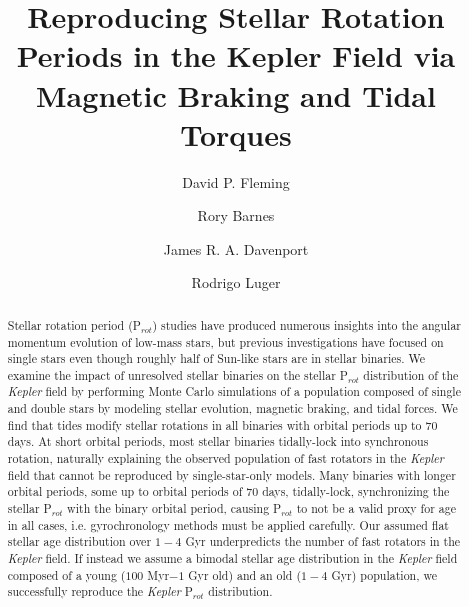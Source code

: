 \documentclass[twocolumn]{aastex61}
\begin{document}
\title{Reproducing Stellar Rotation Periods in the Kepler Field via Magnetic Braking and Tidal Torques}



\author{David P. Fleming}

\author{Rory Barnes}

\author{James R. A. Davenport}

\author{Rodrigo Luger}


\begin{abstract}

Stellar rotation period (P$_{rot}$) studies have produced numerous insights into the angular momentum evolution of low-mass stars, but previous investigations have focused on single stars even though roughly half of Sun-like stars are in stellar binaries. We examine the impact of unresolved stellar binaries on the stellar P$_{rot}$ distribution of the \textit{Kepler} field by performing Monte Carlo simulations of a population composed of single and double stars by modeling stellar evolution, magnetic braking, and tidal forces. We find that tides modify stellar rotations in all binaries with orbital periods up to 70 days.  At short orbital periods, most stellar binaries tidally-lock into synchronous rotation, naturally explaining the observed population of fast rotators in the \textit{Kepler} field that cannot be reproduced by single-star-only models.  Many binaries with longer orbital periods, some up to orbital periods of 70 days, tidally-lock, synchronizing the stellar P$_{rot}$ with the binary orbital period, causing P$_{rot}$ to not be a valid proxy for age in all cases, i.e. gyrochronology methods must be applied carefully. Our assumed flat stellar age distribution over $1-4$ Gyr underpredicts the number of fast rotators in the \textit{Kepler} field. If instead we assume a bimodal stellar age distribution in the \textit{Kepler} field composed of a young ($100$ Myr$-1$ Gyr old) and an old ($1-4$ Gyr) population, we successfully reproduce the \textit{Kepler} P$_{rot}$ distribution.

\end{abstract}
\end{document}
